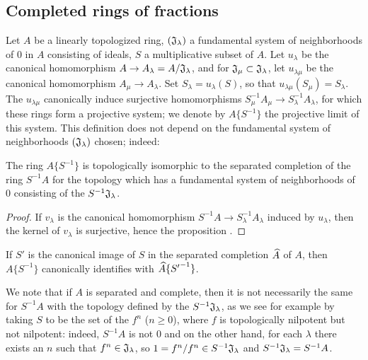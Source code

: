 \subsection{Completed rings of fractions}
\label{subsection:completed-rings-of-fractions}

\begin{env}[7.6.1]
\label{0.7.6.1}
Let $A$ be a linearly topologized ring, $(\mathfrak{J}_\lambda)$ a fundamental system of
neighborhoods of $0$ in $A$ consisting of ideals, $S$ a multiplicative subset of $A$. Let
$u_\lambda$ be the canonical homomorphism $A\to A_\lambda=A/\fk{J}_\lambda$, and for
$\mathfrak{J}_\mu\subset\mathfrak{J}_\lambda$, let $u_{\lambda\mu}$ be the canonical
homomorphism $A_\mu\to A_\lambda$. Set $S_\lambda=u_\lambda(S)$, so that
$u_{\lambda\mu}(S_\mu)=S_\lambda$. The $u_{\lambda\mu}$ canonically induce surjective
homomorphisms $S_\mu^{-1}A_\mu\to S_\lambda^{-1}A_\lambda$, for which these rings form a
projective system; we denote by $A\{S^{-1}\}$ the projective limit of this system. This
definition does not depend on the fundamental system of neighborhoods $(\mathfrak{J}_\lambda)$
chosen; indeed:
\end{env}

\begin{prop}[7.6.2]
\label{0.7.6.2}
The ring $A\{S^{-1}\}$ is topologically isomorphic to the separated completion of the ring
$S^{-1}A$ for the topology which has a fundamental system of neighborhoods of $0$ consisting of
the $S^{-1}\mathfrak{J}_\lambda$.
\end{prop}

\begin{proof}
\label{proof-0.7.6.2}
If $v_\lambda$ is the canonical homomorphism $S^{-1}A\to S_\lambda^{-1}A_\lambda$ induced
by $u_\lambda$, then the kernel of $v_\lambda$ is surjective, hence the proposition .
\end{proof}

\begin{cor}[7.6.3]
\label{0.7.6.3}
If $S'$ is the canonical image of $S$ in the separated completion $\widehat{A}$ of $A$, then
$A\{S^{-1}\}$ canonically identifies with $\widehat{A}\{{S'}^{-1}\}$.
\end{cor}

We note that if $A$ is separated and complete, then it is not necessarily the same for
$S^{-1}A$ with the topology defined by the $S^{-1}\mathfrak{J}_\lambda$, as we see for example
by taking $S$ to be the set of the $f^n$ ($n\geqslant 0$), where $f$ is topologically nilpotent
but not nilpotent: indeed, $S^{-1}A$ is not $0$ and on the other hand, for each $\lambda$ there
exists an $n$ such that $f^n\in\mathfrak{J}_\lambda$, so $1=f^n/f^n\in S^{-1}\mathfrak{J}_\lambda$
and $S^{-1}\mathfrak{J}_\lambda=S^{-1}A$.

